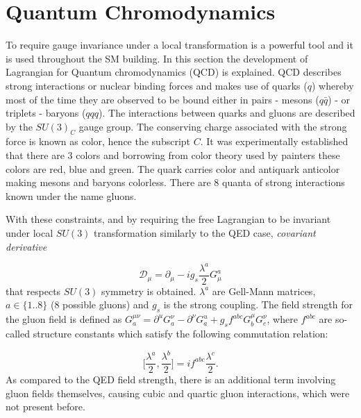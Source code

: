 \section{Quantum Chromodynamics}
\label{qcd}
To require gauge invariance under a local transformation is a powerful tool and it is used throughout the \gls{SM} building. In this section the development of Lagrangian for Quantum chromodynamics (\gls{QCD}) is explained. \gls{QCD} describes strong interactions or nuclear binding forces and makes use of quarks ($q$) whereby most of the time they are observed to be bound either in pairs - mesons ($q\bar{q}$) - or triplets - baryons ($qqq$). The interactions between quarks and gluons are described by the $SU(3)_{C}$ gauge group. The conserving charge associated with the strong force is known as color, hence the subscript $C$. It was experimentally established that there are 3 colors and borrowing from color theory used by painters these colors are red, blue and green. The quark carries color and antiquark anticolor making mesons and baryons colorless. There are 8 quanta of strong interactions known under the name gluons.

With these constraints, and by requiring the free Lagrangian to be invariant under local $SU(3)$ transformation similarly to the \gls{QED} case, \textit{covariant derivative}

\begin{equation}
\mathcal{D}_{\mu} = \partial_{\mu} - ig_{s}\frac{\lambda^{a}}{2}G^{a}_{\mu}
\end{equation}
 that respects $SU(3)$ symmetry is obtained. $\lambda^{a}$ are Gell-Mann matrices, $a\in\{1..8\}$ (8 possible gluons) and $g_{s}$ is the strong coupling. The field strength for the gluon field is defined as $G_{a}^{\mu\nu}=\partial^{u}G_{a}^{\nu} - \partial^{\nu}G_{a}^{u} + g_{s}f^{abc}G_{b}^{\mu}G_{c}^{\nu}$, where $f^{abc}$ are so-called structure constants which satisfy the following commutation relation:

\begin{equation}
	\Big[\frac{\lambda^{a}}{2},\frac{\lambda^{b}}{2}\Big] = if^{abc}\frac{\lambda^{c}}{2}.
\end{equation}
As compared to the \gls{QED} field strength, there is an additional term involving gluon fields themselves, causing cubic and quartic gluon interactions, which were not present before.

